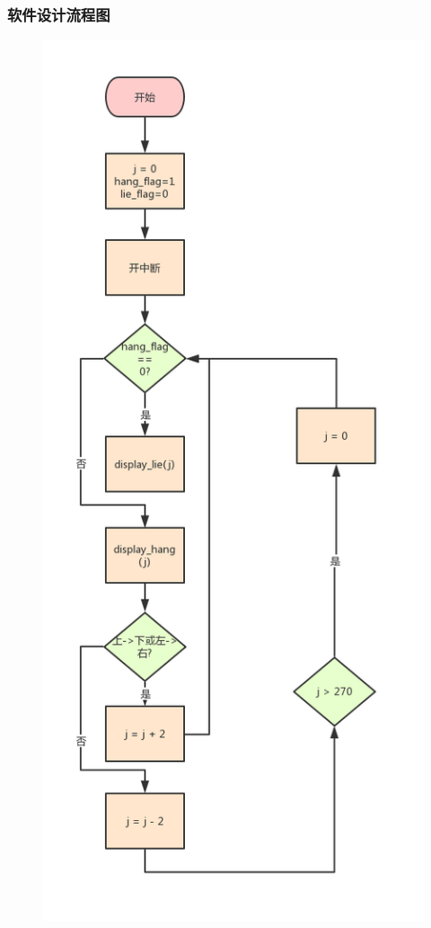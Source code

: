 \documentclass[UTF8]{ctexart}
\begin{document}
\subsubsection{软件设计流程图}
\begin{figure}[ht]
	\centering
	\includegraphics[scale=0.3]{1.png}
\end{figure}
\end{document}
